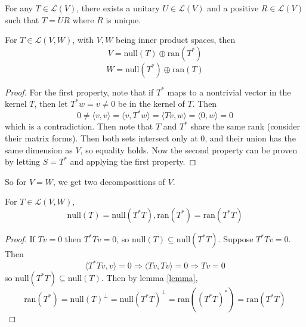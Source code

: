 \documentclass[12pt]{article}
\begin{document}
\begin{thm}\label{polar}
	For any $T \in \mathcal L(V)$, there exists a unitary $U \in \mathcal L(V)$ and a positive $R \in \mathcal L(V)$ such that $T=UR$ where $R$ is unique.
\end{thm}

\begin{lem}\label{lemma}
	For $T \in \mathcal L(V,W)$, with $V,W$ being inner product spaces, then
	$$V = \text{null}(T) \oplus \text{ran}(T^*)$$
	$$W = \text{null}(T^*) \oplus \text{ran}(T)$$
\end{lem}

\begin{proof}
	For the first property, note that if $T^*$ maps to a nontrivial vector in the kernel $T$, then let $T^*w = v \neq 0$ be in the kernel of $T$. Then
	$$0 \neq \langle v,v \rangle = \langle v,T^*w \rangle = \langle Tv,w \rangle = \langle 0,w \rangle = 0$$
	which is a contradiction. Then note that $T$ and $T^*$ share the same rank (consider their matrix forms). Then both sets intersect only at 0, and their union has the same dimension as $V$, so equality holds. Now the second property can be proven by letting $S=T^*$ and applying the first property.
\end{proof}

So for $V=W$, we get two decompositions of $V$.

\begin{lem}
	For $T \in \mathcal L(V,W)$,
	$$\text{null}(T) = \text{null}(T^*T), \text{ran}(T^*) = \text{ran}(T^*T)$$
\end{lem}

\begin{proof}
	If $Tv=0$ then $T^*Tv=0$, so $\text{null}(T) \subseteq \text{null}(T^*T)$. Suppose $T^*Tv = 0$. Then
	$$\langle T^*Tv,v \rangle = 0 \Rightarrow \langle Tv,Tv \rangle = 0 \Rightarrow Tv = 0$$
	so $\text{null}(T^*T) \subseteq \text{null}(T)$. Then by lemma \ref{lemma},
	$$\text{ran}(T^*) = \text{null}(T)^\perp = \text{null}(T^*T)^\perp = \text{ran}((T^*T)^*) = \text{ran}(T^*T)$$
\end{proof}
\end{document}
